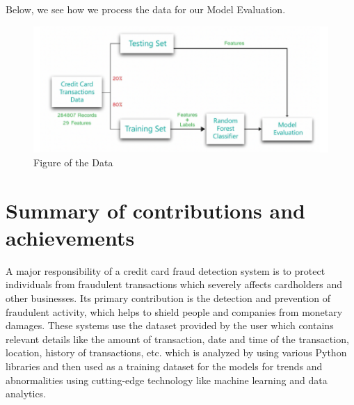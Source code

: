Below, we see how we process the data for our Model Evaluation.

\begin{figure}[ht]
    \centering
    \includegraphics[scale=0.6]{figures/FlowChart.png}
    \caption{Figure of the Data}
    \label{fig:Plot of the Data}
\end{figure}


\section{Summary of contributions and achievements} %
\label{sec:intro_sum_results} %
A major responsibility of a credit card fraud detection system is to protect individuals from fraudulent transactions which severely affects cardholders and other businesses. Its primary contribution is the detection and prevention of fraudulent activity, which helps to shield people and companies from monetary damages. These systems use the dataset provided by the user which contains relevant details like the amount of transaction, date and time of the transaction, location, history of transactions, etc. which is analyzed by using various Python libraries and then used as a training dataset for the models for trends and abnormalities using cutting-edge technology like machine learning and data analytics.  



